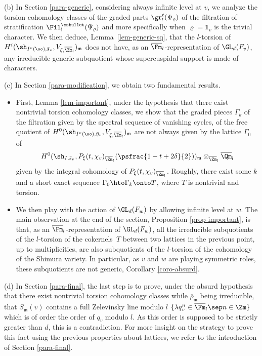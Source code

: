 (b) In Section \ref{para-generic}, considering always infinite level at $v$,
we analyze the torsion
coho\-mology classes of the graded parts $\gr^t_!(\Psi_\varrho)$ of the filtration of
stratification $\Fil^{\csbullet}_!(\Psi_{\varrho})$ and more specifically when
$\varrho=\mathds 1_v$ is the trivial character.
We then deduce, \cf Lem\-ma~\ref{lem-generic-sq}, that the $l$-torsion of
$H^i(\sh_{I^v(\oo),\bar s_v},V_{\xi,\overline \Zm_l})_{\mathfrak m}$
does not have, as an $\overline \Fm_l$\nobreakdash-representation of $\GL_d(F_v)$,
any irreducible generic subquotient whose supercuspidal support is made of
characters.

(c) In Section \ref{para-modification}, we obtain two fundamental results.
\begin{itemize}
\item First, \cf Lemma \ref{lem-important},
under the hypothesis that there exist nontrivial torsion cohomology classes, we show that
the graded pieces $\Gamma_k$ of the filtration given by the spectral sequence of
vanishing cycles, of the free quotient of
$H^0(\sh_{I^v(\oo),\bar \eta_v},V_{\xi,\overline \Zm_l})_{\mathfrak m}$
are not always given by the lattice $\Gamma_0$ of
\[
H^0(\sh_{I,\bar s_v},P_\xi(t,\chi_v)_{\overline \Zm_l}(\psfrac{1-t+2\delta}{2}))_{\mathfrak m}
\otimes_{\overline \Zm_l} \overline \Qm_l
\]
given by the integral cohomology of
$P_\xi(t,\chi_v)_{\overline \Zm_l}$. Roughly, there exist some $k$ and a short exact
sequence $\Gamma_0 \hto \Gamma_k \onto T$, where $T$ is nontrivial and torsion.

\item We then play with the action of $\GL_d(F_w)$ by allowing infinite level at $w$. The main
observation at the end of the section, \cf Proposition \ref{prop-important},
is that, as an $\overline \Fm_l$\nobreakdash-rep\-re\-sentation
of $\GL_d(F_w)$, all the irreducible subquotients of the $l$-torsion of the cokernels~$T$ between two lattices in the previous point, up to multiplicities,
are also subquotients of the $l$-torsion of the cohomology of the Shimura variety.
In particular,
as $v$ and $w$ are playing symmetric roles, these subquotients are not generic,
\cf Corollary \ref{coro-absurd}.
\end{itemize}

(d) In Section \ref{para-final}, the last step is to prove, under the absurd hypothesis that
there exist nontrivial torsion cohomology classes while
$\overline \rho_{\mathfrak m}$ being irreducible, that $S_{\mathfrak m}(v)$
contains a full Zelevinsky line modulo $l$
$\{\lambda q_v^n \in \overline \Fm_l\sep n \in \Zm\}$ which is of order the order
of $q_v$ modulo $l$. As this order is supposed to be strictly greater than $d$,
this is a contradiction. For more insight on the strategy to prove this fact using the previous
properties about lattices, we refer to
the introduction of Section \ref{para-final}.

